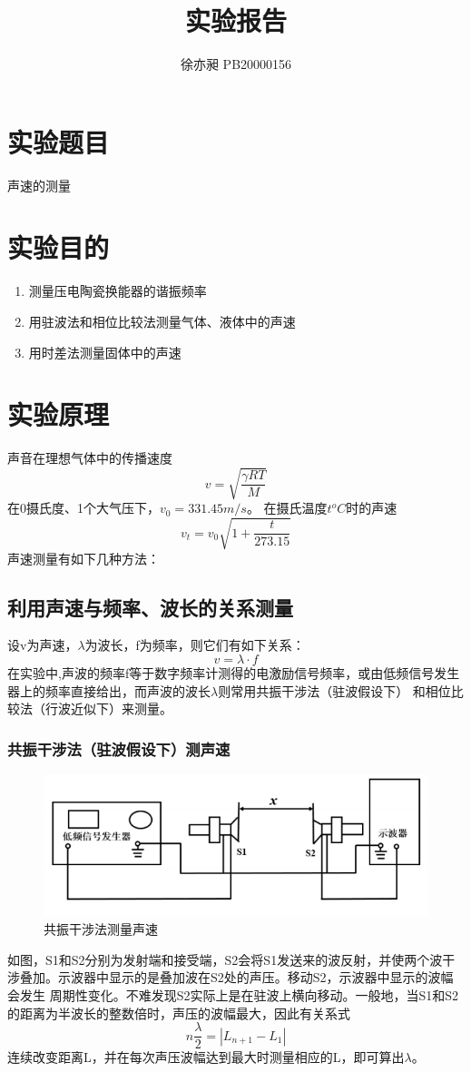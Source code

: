 \documentclass[UTF8]{ctexart}
\begin{document}
\title{实验报告}  
\author{徐亦昶 PB20000156}
\maketitle
\section{实验题目}声速的测量
\section{实验目的}
\begin{enumerate}
    \item 测量压电陶瓷换能器的谐振频率
    \item 用驻波法和相位比较法测量气体、液体中的声速
    \item 用时差法测量固体中的声速
\end{enumerate}
\section{实验原理}
声音在理想气体中的传播速度
\[v=\sqrt{\frac{\gamma RT}{M}}\]
在0摄氏度、1个大气压下，$v_0=331.45m/s$。
\newline
在摄氏温度$t^oC$时的声速
\[v_t=v_0\sqrt{1+\frac{t}{273.15}}\]
声速测量有如下几种方法：
\subsection{利用声速与频率、波长的关系测量}
设v为声速，$\lambda$为波长，f为频率，则它们有如下关系：
\[v=\lambda\cdot f\]
在实验中,声波的频率f等于数字频率计测得的电激励信号频率，或由低频信号发生器上的频率直接给出，而声波的波长$\lambda$则常用共振干涉法（驻波假设下）
和相位比较法（行波近似下）来测量。
\subsubsection{共振干涉法（驻波假设下）测声速}
\begin{figure}[h]
    \centering
    \includegraphics[scale=1]{共振干涉法.PNG}
    \caption{共振干涉法测量声速}
\end{figure}
如图，S1和S2分别为发射端和接受端，S2会将S1发送来的波反射，并使两个波干涉叠加。示波器中显示的是叠加波在S2处的声压。移动S2，示波器中显示的波幅会发生
周期性变化。不难发现S2实际上是在驻波上横向移动。一般地，当S1和S2的距离为半波长的整数倍时，声压的波幅最大，因此有关系式
\[n\frac{\lambda}{2}=|L_{n+1}-L_1|\]
连续改变距离L，并在每次声压波幅达到最大时测量相应的L，即可算出$\lambda$。
\end{document}
